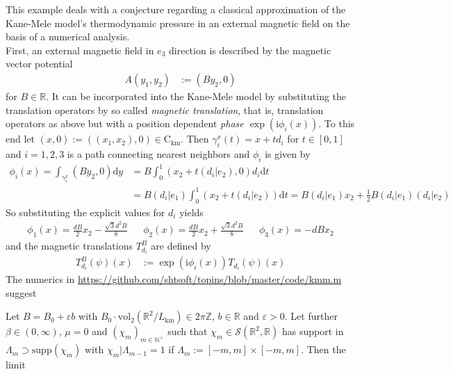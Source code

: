 \begin{exa}
\label{exa:tdpressure}
This example deals with a conjecture regarding a classical approximation of the Kane-Mele model's thermodynamic pressure in an external magnetic field on the basis of a numerical analysis.
\\
First, an external magnetic field in $e_{3}$ direction is described by the magnetic vector potential
\begin{align*}
  A(y_{1},y_{2})
  &:=
  (By_{2},0)
\end{align*}
for $B \in \mathbb{R}$. It can be incorporated into the Kane-Mele model by substituting the translation operators by so called \textit{magnetic translation}, that is, translation operators as above but with a position dependent \textit{phase $\exp(\mathrm{i}\phi_{i}(x))$}. To this end let $(x,0) := ((x_{1},x_{2}),0) \in \mathrm{C}_{\textrm{km}}$. Then $\gamma_{i}^{x}(t) = x +td_{i}$ for $t \in [0,1]$ and $i =1,2,3$ is a path connecting nearest neighbors and $\phi_{i}$ is given by
\begin{align*}
  \phi_{i}(x)
  =
  \int_{\gamma_{i}^{x}}
  (By_{2},0)
  \mathrm{d}y
  &=
  B
  \int_{0}^{1}
  (x_{2}+t(d_{i} \vert e_{2}),0)
  d_{i}
  \mathrm{d}t
  \\
  &=
  B
  (d_{i} \vert e_{1})
  \int_{0}^{1}
  (x_{2}+t(d_{i} \vert e_{2}))
  \mathrm{d}t
  =
  B
  (d_{i} \vert e_{1})
  x_{2}
  +
  \frac{1}{2}
  B
  (d_{i} \vert e_{1})
  (d_{i} \vert e_{2})
\end{align*}
So substituting the explicit values for $d_{i}$ yields
\begin{align*}
  \phi_{1}(x)
  =
  \frac{dB}{2}
  x_{2}
  -
  \frac{\sqrt{3}d^{2}B}{8}
  &&
  \phi_{2}(x)
  =
  \frac{dB}{2}
  x_{2}
  +
  \frac{\sqrt{3}d^{2}B}{8}
  &&
  \phi_{3}(x)
  =
  -
  dBx_{2}
\end{align*}
and the magnetic translations $T_{d_{i}}^{B}$ are defined by
\begin{align*}
  T_{d_{i}}^{B}(\psi)(x)
  &:=
  \exp(\mathrm{i}\phi_{i}(x))
  T_{d_{i}}(\psi)(x)
\end{align*}
The numerics in \href{https://github.com/shtsoft/topins/blob/master/code/kmm.m}{https://github.com/shtsoft/topins/blob/master/code/kmm.m} suggest
\\
\begin{con}
\label{con:pressofkmm}
Let $B = B_{0} + \varepsilon b$ with $B_{0} \cdot \mathrm{vol}_{2}(\mathbb{R}^{2}/L_{\textrm{km}}) \in 2\pi\mathbb{Z}$, $b \in \mathbb{R}$ and $\varepsilon > 0$. Let further $\beta \in (0,\infty)$, $\mu = 0$ and $(\chi_{m})_{m\in\mathbb{N}^{\times}}$ such that $\chi_{m} \in \mathcal{S}(\mathbb{R}^{2},\mathbb{R})$ has support in $\Lambda_{m} \supset \mathrm{supp}(\chi_{m})$ with $\chi_{m} \vert \Lambda_{m-1} = 1$ if $\Lambda_{m} := [-m,m] \times [-m,m]$. Then the limit

\end{con}
\end{exa}
